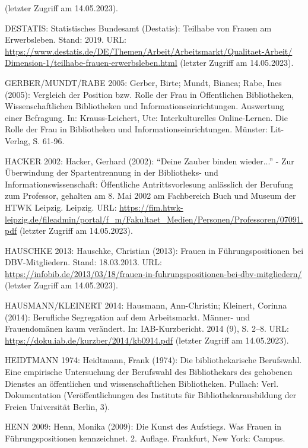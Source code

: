 \documentclass[a4paper,
fontsize=11pt,
oneside,
numbers=noperiodatend,
parskip=half-,
bibliography=totoc,
final
]{scrartcl}
\begin{document}
(letzter Zugriff am 14.05.2023).

DESTATIS: Statistisches Bundesamt (Destatis): Teilhabe von Frauen am
Erwerbsleben. Stand: 2019. URL:
\href{https://www.destatis.de/DE/Themen/Arbeit/Arbeitsmarkt/Qualitaet-Arbeit/Dimension-1/teilhabe-frauen-erwerbsleben.html}{https://www.destatis.de/DE/Themen/Arbeit/Arbeitsmarkt/Qualitaet-Arbeit/ \break Dimension-1/teilhabe-frauen-erwerbsleben.html}
(letzter Zugriff am 14.05.2023).

GERBER/MUNDT/RABE 2005: Gerber, Birte; Mundt, Bianca; Rabe, Ines (2005):
Vergleich der Position bzw. Rolle der Frau in Öffentlichen Bibliotheken,
Wissenschaftlichen Bibliotheken und Informationseinrichtungen.
Auswertung einer Befragung. In: Krauss-Leichert, Ute: Interkulturelles
Online-Lernen. Die Rolle der Frau in Bibliotheken und
Informationseinrichtungen. Münster: Lit-Verlag, S. 61-96.

HACKER 2002: Hacker, Gerhard (2002): \enquote{Deine Zauber binden
wieder...} - Zur Überwindung der Spartentrennung in der Bibliotheks- und
Informationswissenschaft: Öffentliche Antrittsvorlesung anlässlich der
Berufung zum Professor, gehalten am 8. Mai 2002 am Fachbereich Buch und
Museum der HTWK Leipzig. Leipzig. URL:
\url{https://fim.htwk-leipzig.de/fileadmin/portal/f_m/Fakultaet_Medien/Personen/Professoren/07091.pdf}
(letzter Zugriff am 14.05.2023).

HAUSCHKE 2013: Hauschke, Christian (2013): Frauen in Führungspositionen
bei DBV-Mitgliedern. Stand: 18.03.2013. URL:
\url{https://infobib.de/2013/03/18/frauen-in-fuhrungspositionen-bei-dbv-mitgliedern/}
(letzter Zugriff am 14.05.2023).

HAUSMANN/KLEINERT 2014: Hausmann, Ann-Christin; Kleinert, Corinna
(2014): Berufliche Segregation auf dem Arbeitsmarkt. Männer- und
Frauendomänen kaum verändert. In: IAB-Kurzbericht. 2014 (9), S. 2--8.
URL: \url{https://doku.iab.de/kurzber/2014/kb0914.pdf} (letzter Zugriff
am 14.05.2023).

HEIDTMANN 1974: Heidtmann, Frank (1974): Die bibliothekarische
Berufswahl. Eine empirische Untersuchung der Berufswahl des
Bibliothekars des gehobenen Dienstes an öffentlichen und
wissenschaftlichen Bibliotheken. Pullach: Verl. Dokumentation
(Veröffentlichungen des Instituts für Bibliothekarausbildung der Freien
Universität Berlin, 3).

HENN 2009: Henn, Monika (2009): Die Kunst des Aufstiegs. Was Frauen in
Führungspositionen kennzeichnet. 2. Auflage. Frankfurt, New York:
Campus.
\end{document}
